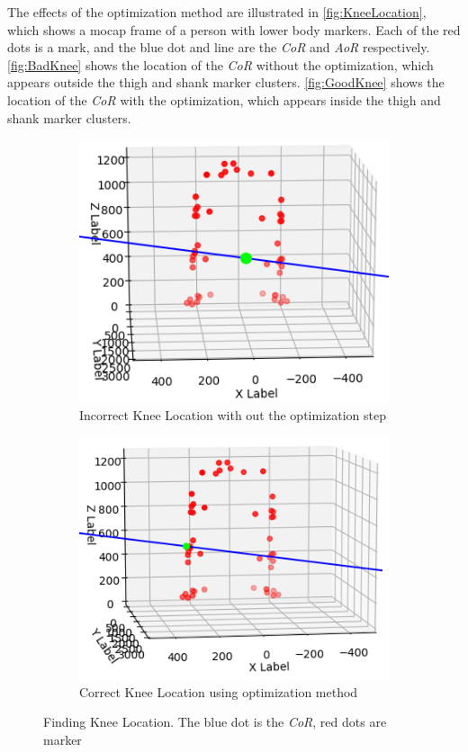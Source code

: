 The effects of the optimization method are illustrated in \autoref{fig:KneeLocation}, which shows a mocap frame of a person with lower body markers. Each of the red dots is a mark, and the blue dot and line are the \textit{CoR} and \textit{AoR} respectively. \autoref{fig:BadKnee} shows the location of the \textit{CoR} without the optimization, which appears outside the thigh and shank marker clusters. \autoref{fig:GoodKnee} shows the location of the \textit{CoR} with the optimization, which appears inside the thigh and shank marker clusters.



\begin{figure}[]
    \centering
    \begin{subfigure}{.45\textwidth}
        \centering
        \includegraphics[scale=0.40]{images/software/bad_knee_edit.png}
        \caption[Incorrect Knee Location]{Incorrect Knee Location with out the optimization step}
        \label{fig:BadKnee}
    \end{subfigure}%
    \hfill
    \begin{subfigure}{.45\textwidth}
        \centering
        \includegraphics[scale=0.40]{images/software/good_knee_edit.png}
        \caption[Correct Knee Location]{Correct Knee Location using optimization method}
        \label{fig:GoodKnee}
    \end{subfigure}
    \caption[Finding Knee location]{Finding Knee Location. The blue dot is the \textit{CoR}, red dots are marker}
    \label{fig:KneeLocation}
\end{figure}

